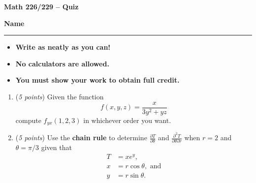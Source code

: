 \documentclass[12 pt]{article}
\begin{document}
  \begin{center}
    \textbf{\hfill Math 226/229 -- Quiz} \\
  \end{center}
  \medskip

  \noindent
  \textbf{Name}\ \rule{3.5in}{.4pt} \hfill
  \vspace{.1in}
  \hspace*{0.2in}
  \begin{itemize}
    \item \textbf{Write as neatly as you can!}
    \item \textbf{No calculators are allowed.}
    \item \textbf{You must show your work to obtain full credit.}
  \end{itemize}

	\medskip
  \noindent

  \begin{enumerate}
    \item (\textit{5 points})
    Given the function \[
      f(x, y, z) = \frac{x}{3y^2 + yz}
    \] compute $f_{yx} (1, 2, 3)$ in whichever order you want.
		\vspace{2in}
		\item (\textit{5 points})
		Use the \textbf{chain rule} to determine
    $\displaystyle \frac{\partial T}{\partial \theta}$ and
    $\displaystyle \frac{\partial^2 T}{\partial \theta \partial r}$
    when $r = 2$ and $\theta = \pi/3$
    given that \begin{align*}
      T &= xe^y, \\
      x &= r\cos\theta, \text{ and}\\
      y &= r\sin\theta.
    \end{align*}
  \end{enumerate}
\end{document}
